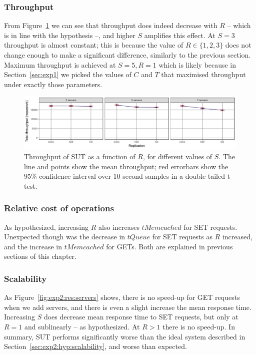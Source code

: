 \documentclass[11pt]{article}
\begin{document}
\subsubsection{Throughput}

From Figure~\ref{fig:exp2:res:throughput} we can see that throughput does indeed decrease with $R$ -- which is in line with the hypothesis --, and higher $S$ amplifies this effect. At $S=3$ throughput is almost constant; this is because the value of $R \in \{1,2,3\}$ does not change enough to make a significant difference, similarly to the previous section. Maximum throughput is achieved at $S=5, R=1$ which is likely because in Section~\ref{sec:exp1} we picked the values of $C$ and $T$ that maximised throughput under exactly those parameters.

\begin{figure}[h]
\centering
\includegraphics[width=\textwidth]{../results/replication/graphs/tp_vs_replication_all.pdf}
\caption{Throughput of SUT as a function of $R$, for different values of $S$. The line and points show the mean throughput; red errorbars show the 95\% confidence interval over 10-second samples in a double-tailed t-test.}
\label{fig:exp2:res:throughput}
\end{figure}

\subsubsection{Relative cost of operations}
As hypothesized, increasing $R$ also increases $tMemcached$ for SET requests. Unexpected though was the decrease in $tQueue$ for SET requests as $R$ increased, and the increase in $tMemcached$ for GETs. Both are explained in previous sections of this chapter.

\subsubsection{Scalability}
As Figure~\ref{fig:exp2:res:servers} shows, there is no speed-up for GET requests when we add servers, and there is even a slight increase the mean response time. Increasing $S$ does decrease mean response time to SET requests, but only at $R=1$ and sublinearly -- as hypothesized. At $R>1$ there is no speed-up. In summary, SUT performs significantly worse than the ideal system described in Section~\ref{sec:exp2:hyp:scalability}, and worse than expected.
\end{document}
